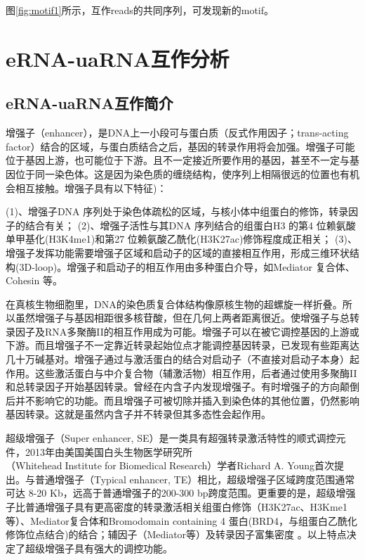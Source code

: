 \documentclass[
]{ctexart}
\begin{document}
图\ref{fig:motif1}所示，互作reads的共同序列，可发现新的motif。

\hypertarget{erna-uarnaux4e92ux4f5cux5206ux6790}{%
\section{eRNA-uaRNA互作分析}\label{erna-uarnaux4e92ux4f5cux5206ux6790}}

\hypertarget{erna-uarnaux4e92ux4f5cux7b80ux4ecb}{%
\subsection{eRNA-uaRNA互作简介}\label{erna-uarnaux4e92ux4f5cux7b80ux4ecb}}

增强子（enhancer），是DNA上一小段可与蛋白质（反式作用因子；trans-acting factor）结合的区域，与蛋白质结合之后，基因的转录作用将会加强。增强子可能位于基因上游，也可能位于下游。且不一定接近所要作用的基因，甚至不一定与基因位于同一染色体。这是因为染色质的缠绕结构，使序列上相隔很远的位置也有机会相互接触。增强子具有以下特征)：

(1)、增强子DNA 序列处于染色体疏松的区域，与核小体中组蛋白的修饰，转录因子的结合有关；
(2)、增强子活性与其DNA 序列结合的组蛋白H3 的第4 位赖氨酸单甲基化(H3K4me1)和第27 位赖氨酸乙酰化(H3K27ac)修饰程度成正相关；
(3)、增强子发挥功能需要增强子区域和启动子的区域的直接相互作用，形成三维环状结构(3D-loop)。增强子和启动子的相互作用由多种蛋白介导，如Mediator 复合体、Cohesin 等。

在真核生物细胞里，DNA的染色质复合体结构像原核生物的超螺旋一样折叠。所以虽然增强子与基因相距很多核苷酸，但在几何上两者距离很近。使增强子与总转录因子及RNA多聚酶II的相互作用成为可能。增强子可以在被它调控基因的上游或下游。而且增强子不一定靠近转录起始位点才能调控基因转录，已发现有些距离达几十万碱基对。增强子通过与激活蛋白的结合对启动子（不直接对启动子本身）起作用。这些激活蛋白与中介复合物（辅激活物）相互作用，后者通过使用多聚酶II和总转录因子开始基因转录。曾经在内含子内发现增强子。有时增强子的方向颠倒后并不影响它的功能。而且增强子可被切除并插入到染色体的其他位置，仍然影响基因转录。这就是虽然内含子并不转录但其多态性会起作用。

超级增强子（Super enhancer, SE）是一类具有超强转录激活特性的顺式调控元件，2013年由美国美国白头生物医学研究所（WhiteheadInstituteforBiomedicalResearch）学者Richard A. Young首次提出。与普通增强子（Typical enhancer, TE）相比，超级增强子区域跨度范围通常可达 8-20 Kb，远高于普通增强子的200-300 bp跨度范围。更重要的是，超级增强子比普通增强子具有更高密度的转录激活相关组蛋白修饰（H3K27ac、H3Kme1等）、Mediator复合体和Bromodomain containing 4 蛋白(BRD4，与组蛋白乙酰化修饰位点结合)的结合；辅因子（Mediator等）及转录因子富集密度 。以上特点决定了超级增强子具有强大的调控功能。
\end{document}
